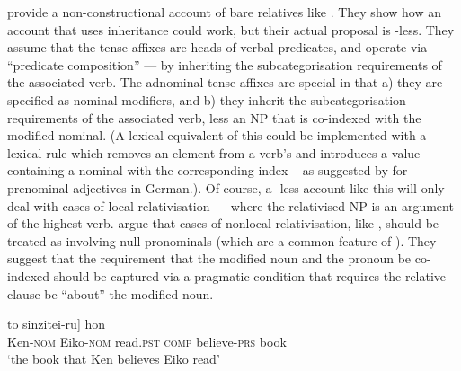\documentclass[output=paper,biblatex,babelshorthands,newtxmath,draftmode,colorlinks,citecolor=brown]{langscibook}
\begin{document}
\citet{SiraiGunjiRelative} provide a non-constructional account of  bare relatives
like . They show how an account that uses  inheritance could
work, but their actual proposal is -less. They assume that the tense affixes
are heads of verbal predicates, and operate via ``predicate composition'' --- by
inheriting the subcategorisation requirements of the associated verb. The adnominal tense
affixes are special in that a) they are specified as nominal modifiers, and b) they
inherit the subcategorisation requirements of the associated verb, less an NP that is
co-indexed with the modified nominal. (A lexical equivalent of this could be implemented with a lexical rule which removes an
element from a verb's  and introduces a  value containing a
nominal with the corresponding index -- as suggested by \citet[Section~3.2.7]{Mueller2002b} for prenominal
adjectives in German.).
Of course, a -less account like this
will only deal with cases of local relativisation --- where the relativised NP is an
argument of the highest verb. \citeauthor{SiraiGunjiRelative} argue that cases of
nonlocal relativisation, like , should be treated as involving
null-pronominals (which are a common feature of ). They suggest that the requirement
that the modified noun and the pronoun be co-indexed should be captured via a pragmatic
condition that requires the relative clause be ``about'' the modified noun.
 \begin{exe}\ex\label{x:rc-85}
   \gll [Ken-ga                                  [Eiko-ga     \trace\subscr{i} yon-da] to sinzitei-ru] hon\\
        \hphantom{[}Ken-\textsc{nom} \hphantom{[}Eiko-\textsc{nom} {}        read.\textsc{pst} \textsc{comp}
          believe-\textsc{prs} book\\
 \glt `the book that Ken believes Eiko read'
 \end{exe}

\end{document}
